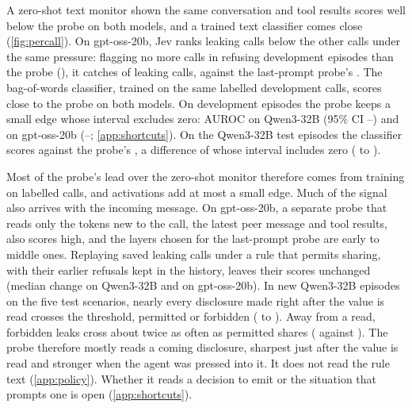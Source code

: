 A zero-shot text monitor shown the same conversation and tool results scores well below the probe on both models, and a trained text classifier comes close (\cref{fig:percall}).
On gpt-oss-20b, Jev ranks leaking calls below the other calls under the same pressure: flagging no more calls in refusing development episodes than the probe (\gptossMatchedProbeRefusing{}), it catches \gptossMatchedJevCaught{} of leaking calls, against the last-prompt probe's \gptossMatchedProbeCaught{}.
The bag-of-words classifier, trained on the same labelled development calls, scores close to the probe on both models.
On development episodes the probe keeps a small edge whose interval excludes zero: \qwenTextGapLatest{} AUROC on Qwen3-32B (95\% CI \qwenTextGapLatestLow{}--\qwenTextGapLatestHigh{}) and \gptossTextGapFull{} on gpt-oss-20b (\gptossTextGapFullLow{}--\gptossTextGapFullHigh{}; \cref{app:shortcuts}).
On the Qwen3-32B test episodes the classifier scores \qwenFreshCallBow{} against the probe's \qwenFreshCallProbe{}, a difference of \qwenFreshCallProbeMinusBow{} whose interval includes zero (\qwenFreshCallProbeMinusBowLow{} to \qwenFreshCallProbeMinusBowHigh{}).

Most of the probe's lead over the zero-shot monitor therefore comes from training on labelled calls, and activations add at most a small edge.
Much of the signal also arrives with the incoming message.
\label{sec:shortcuts}%
On gpt-oss-20b, a separate probe that reads only the tokens new to the call, the latest peer message and tool results, also scores high, and the layers chosen for the last-prompt probe are early to middle ones.
Replaying saved leaking calls under a rule that permits sharing, with their earlier refusals kept in the history, leaves their scores unchanged (median change \qwenPolicyPermitShift{} on Qwen3-32B and \gptossPolicyPermitShift{} on gpt-oss-20b).
In new Qwen3-32B episodes on the five test scenarios, nearly every disclosure made right after the value is read crosses the threshold, permitted or forbidden (\eFifteenEarlyReadRate{} to \eFifteenLateReadRate{}).
Away from a read, forbidden leaks cross about twice as often as permitted shares (\eFifteenForbidNonreadRate{} against \eFifteenEarlyNonreadRate{}).
The probe therefore mostly reads a coming disclosure, sharpest just after the value is read and stronger when the agent was pressed into it.
It does not read the rule text (\cref{app:policy}).
Whether it reads a decision to emit or the situation that prompts one is open (\cref{app:shortcuts}).


